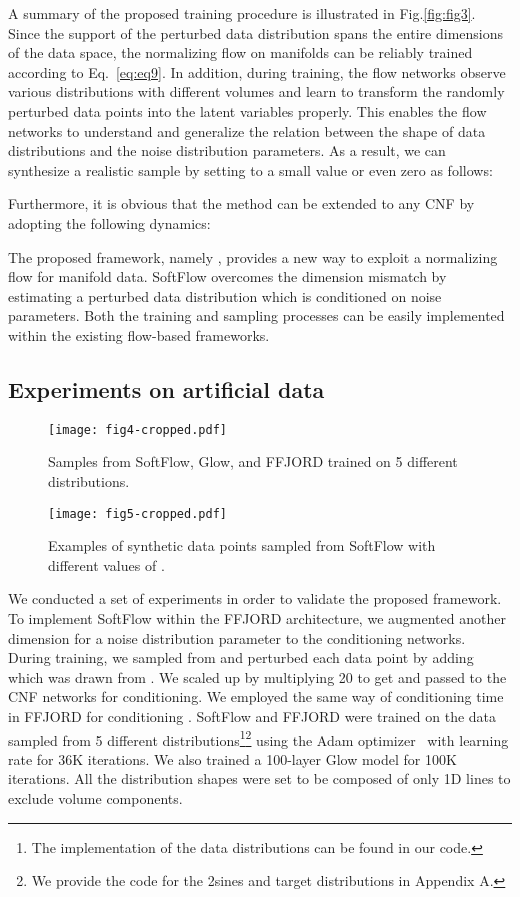 \documentclass{article}
\begin{document}
A summary of the proposed training procedure is illustrated in Fig.\ref{fig:fig3}. Since the support of the perturbed data distribution spans the entire dimensions of the data space, the normalizing flow on manifolds can be reliably trained according to Eq.~\eqref{eq:eq9}. In addition, during training, the flow networks observe various distributions with different volumes and learn to transform the randomly perturbed data points into the latent variables properly. This enables the flow networks to understand and generalize the relation between the shape of data distributions and the noise distribution parameters. As a result, we can synthesize a realistic sample  by setting  to a small value or even zero as follows:


Furthermore, it is obvious that the method can be extended to any CNF by adopting the following dynamics:


The proposed framework, namely , provides a new way to exploit a normalizing flow for manifold data. SoftFlow overcomes the dimension mismatch by estimating a perturbed data distribution which is conditioned on noise parameters. Both the training and sampling processes can be easily implemented within the existing flow-based frameworks.


\subsection{Experiments on artificial data}
\begin{figure}[t]
	\centering
	\hspace*{-0.57in}
	\texttt{[image: fig4-cropped.pdf]}
    \caption{Samples from SoftFlow, Glow, and FFJORD trained on 5 different distributions.}
	\label{fig:fig4}
\end{figure}
\begin{figure}[t]
	\centering
	\texttt{[image: fig5-cropped.pdf]}
    \caption{Examples of synthetic data points sampled from SoftFlow with different values of .}
	\label{fig:fig5}
\end{figure}


We conducted a set of experiments in order to validate the proposed framework. To implement SoftFlow within the FFJORD architecture, we augmented another dimension for a noise distribution parameter to the conditioning networks.
During training, we sampled  from  and perturbed each data point  by adding  which was drawn from . We scaled up  by multiplying 20 to get  and passed  to the CNF networks for conditioning. 
We employed the same way of conditioning time  in FFJORD for conditioning . 
SoftFlow and FFJORD were trained on the data sampled from 5 different distributions\footnote{The implementation of the data distributions can be found in our code.}\footnote{We provide the code for the 2sines and target distributions in Appendix A.} using the Adam optimizer~\citep{kingma2014adam} with learning rate  for 36K iterations. 
We also trained a 100-layer Glow model for 100K iterations. 
All the distribution shapes were set to be composed of only 1D lines to exclude volume components.
\end{document}
